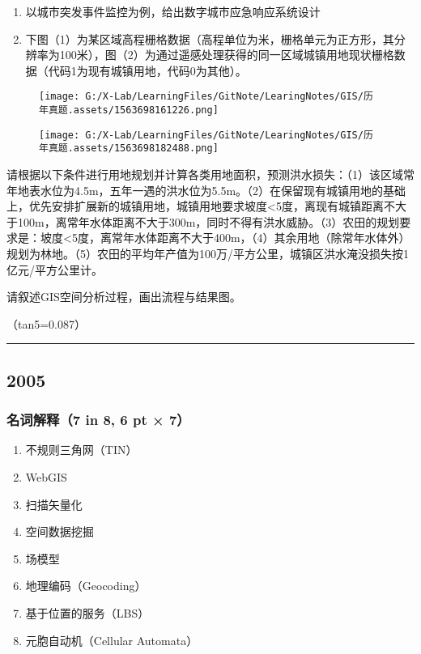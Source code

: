 \documentclass[]{article}
\begin{document}
\begin{enumerate}
\def\labelenumi{\arabic{enumi}.}
\item
  以城市突发事件监控为例，给出数字城市应急响应系统设计
\item
  下图（1）为某区域高程栅格数据（高程单位为米，栅格单元为正方形，其分辨率为100米），图（2）为通过遥感处理获得的同一区域城镇用地现状栅格数据（代码1为现有城镇用地，代码0为其他）。
\end{enumerate}

\begin{figure}
\centering
\texttt{[image: G:/X-Lab/LearningFiles/GitNote/LearingNotes/GIS/历年真题.assets/1563698161226.png]}
\caption{}
\end{figure}

\begin{figure}
\centering
\texttt{[image: G:/X-Lab/LearningFiles/GitNote/LearingNotes/GIS/历年真题.assets/1563698182488.png]}
\caption{}
\end{figure}

请根据以下条件进行用地规划并计算各类用地面积，预测洪水损失：（1）该区域常年地表水位为4.5m，五年一遇的洪水位为5.5m。（2）在保留现有城镇用地的基础上，优先安排扩展新的城镇用地，城镇用地要求坡度\textless{}5度，离现有城镇距离不大于100m，离常年水体距离不大于300m，同时不得有洪水威胁。（3）农田的规划要求是：坡度\textless{}5度，离常年水体距离不大于400m，（4）其余用地（除常年水体外）规划为林地。（5）农田的平均年产值为100万/平方公里，城镇区洪水淹没损失按1亿元/平方公里计。

请叙述GIS空间分析过程，画出流程与结果图。

（tan5=0.087）

\begin{center}\rule{0.5\linewidth}{\linethickness}\end{center}

\hypertarget{header-n258}{%
\subsection{2005}\label{header-n258}}

\hypertarget{header-n259}{%
\subsubsection{名词解释（7 in 8, 6 pt × 7）}\label{header-n259}}

\begin{enumerate}
\def\labelenumi{\arabic{enumi}.}
\item
  不规则三角网（TIN）
\item
  WebGIS
\item
  扫描矢量化
\item
  空间数据挖掘
\item
  场模型
\item
  地理编码（Geocoding）
\item
  基于位置的服务（LBS）
\item
  元胞自动机（Cellular Automata）
\end{enumerate}
\end{document}
